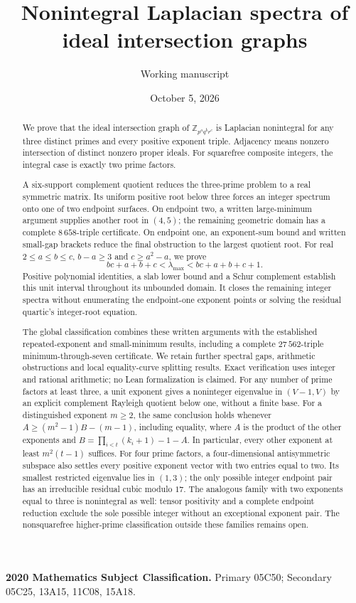 \documentclass[11pt]{article}
\title{Nonintegral Laplacian spectra of ideal intersection graphs}
\author{Working manuscript}
\date{October 5, 2026}
\theoremstyle{remark}
\begin{document}
\maketitle
\begin{abstract}
We prove that the ideal intersection graph of
$\mathbb Z_{p^a q^b r^c}$ is Laplacian nonintegral for any three
distinct primes and every positive exponent triple. Adjacency means
nonzero intersection of distinct nonzero proper ideals. For squarefree
composite integers, the integral case is exactly two prime factors.

A six-support complement quotient reduces the three-prime problem to
a real symmetric matrix. Its uniform positive root below three forces
an integer spectrum onto one of two endpoint surfaces. On endpoint two,
a written large-minimum argument supplies another root in $(4,5)$;
the remaining geometric domain has a complete $8\,658$-triple certificate.
On endpoint one, an exponent-sum bound and written small-gap brackets
reduce the final obstruction to the largest quotient root. For real
$2\leq a\leq b\leq c$, $b-a\geq3$ and $c\geq a^2-a$, we prove
\[
 bc+a+b+c<\lambda_{\max}<bc+a+b+c+1.
\]
Positive polynomial identities, a slab lower bound and a Schur complement establish
this unit interval throughout its unbounded domain. It closes the
remaining integer spectra without enumerating the endpoint-one exponent
points or solving the residual quartic's integer-root equation.

The global classification combines these written arguments with the
established repeated-exponent and small-minimum results, including a
complete $27\,562$-triple minimum-through-seven certificate. We retain
further spectral gaps, arithmetic obstructions and local equality-curve
splitting results. Exact verification uses integer and rational arithmetic;
no Lean formalization is claimed.
For any number of prime factors at least three, a unit exponent
gives a noninteger eigenvalue in $(V-1,V)$ by an explicit complement
Rayleigh quotient below one, without a finite base.
For a distinguished exponent $m\geq2$, the same conclusion holds
whenever $A\geq(m^2-1)B-(m-1)$, including equality, where $A$ is the
product of the other exponents and $B=\prod_{i<t}(k_i+1)-1-A$.
In particular, every other exponent at least $m^2(t-1)$ suffices.
For four prime factors, a four-dimensional antisymmetric subspace
also settles every positive exponent vector with two entries equal to two.
Its smallest restricted eigenvalue lies in $(1,3)$; the only possible
integer endpoint pair has an irreducible residual cubic modulo $17$.
The analogous family with two exponents equal to three is nonintegral
as well: tensor positivity and a complete endpoint reduction exclude
the sole possible integer without an exceptional exponent pair.
The nonsquarefree higher-prime classification outside these families
remains open.
\end{abstract}
\noindent\textbf{2020 Mathematics Subject Classification.}
Primary 05C50; Secondary 05C25, 13A15, 11C08, 15A18.
\end{document}
